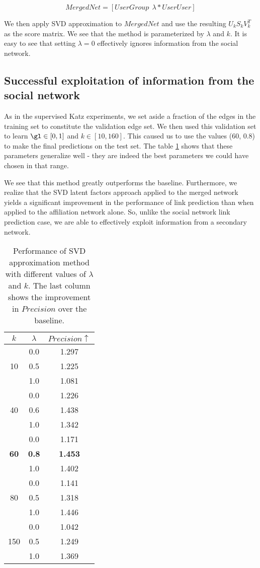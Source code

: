 \documentclass{report}
\begin{document}
\begin{equation*}
MergedNet = [UserGroup \ \ \lambda * UserUser]
\end{equation*}

We then apply SVD approximation to $MergedNet$ and use the resulting $U_kS_kV_k^{T}$ as the score matrix. We see that the method is parameterized by $\lambda$ and $k$. It is easy to see that setting $\lambda = 0$ effectively ignores information from the social network.

\subsection{Successful exploitation of information from the social network}
As in the supervised Katz experiments, we set aside a fraction of the edges in the training set to constitute the validation edge set. We then used this validation set to learn $\gl \in [0, 1]$ and $k \in [10, 160]$. This caused us to use the values (60, 0.8) to make the final predictions on the test set. The table \ref{tab:svdAff} shows that these parameters generalize well - they are indeed the best parameters we could have chosen in that range.

We see that this method greatly outperforms the baseline. Furthermore, we realize that the SVD latent factors approach applied to the merged network yields a significant improvement in the performance of link prediction than when applied to the affiliation network alone. So, unlike the social network link prediction case, we are able to effectively exploit information from a secondary network.

\begin{table}
\centering
\begin{tabular}{| c | c | c |}
\hline
$k$ & $\lambda$ & $Precision\uparrow $\\
\hline
\multirow{3}{*}{10} 
& 0.0 & 1.297\\
& 0.5 & 1.225\\
& 1.0 & 1.081\\
\hline
\multirow{3}{*}{40} 
& 0.0 & 1.226\\
& 0.6 & 1.438\\
& 1.0 & 1.342\\
\hline
\multirow{3}{*}{\textbf{60}} 
& 0.0 & 1.171\\
& \textbf{0.8} & \textbf{1.453}\\
& 1.0 & 1.402\\
\hline
\multirow{3}{*}{80} 
& 0.0 & 1.141\\
& 0.5 & 1.318\\
& 1.0 & 1.446\\
\hline
\multirow{3}{*}{150}
& 0.0 & 1.042\\
& 0.5 & 1.249\\
& 1.0 & 1.369\\
\hline
\end{tabular}
\caption{Performance of SVD approximation method with different values of $\lambda$ and $k$. The last column shows the improvement in $Precision$ over the baseline.}
\label{tab:svdAff}
\end{table} 
\end{document}
